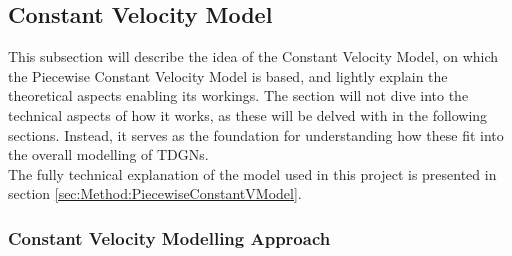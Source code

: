 
\subsection{Constant Velocity Model}
\label{sec:Method:VModel}

This subsection will describe the idea of the Constant Velocity Model, on which the Piecewise Constant Velocity Model is based, and lightly explain the theoretical aspects enabling its workings.
The section will not dive into the technical aspects of how it works, as these will be delved with in the following sections.
Instead, it serves as the foundation for understanding how these fit into the overall modelling of TDGNs.
\\
The fully technical explanation of the model used in this project is presented in section \ref{sec:Method:PiecewiseConstantVModel}.


\subsubsection{Constant Velocity Modelling Approach}
\label{sec:Method:VModel:ModellingApproach}

